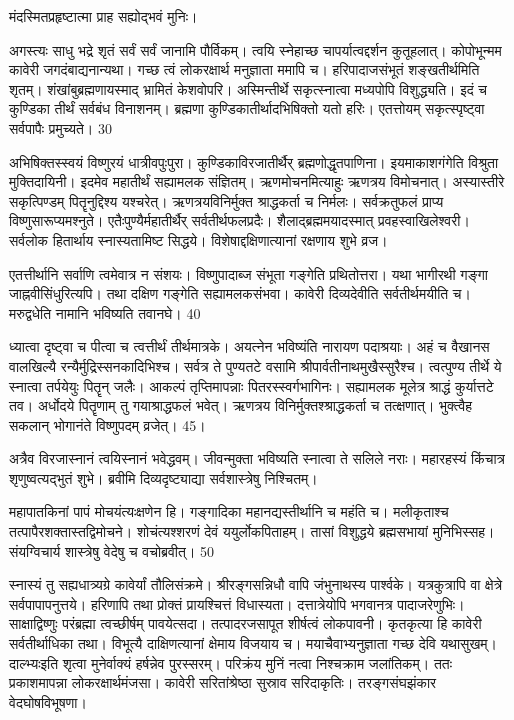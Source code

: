  मंदस्मितप्रहृष्टात्मा प्राह सह्योद्भवं मुनिः।
 
अगस्त्यः
साधु भद्रे शृतं सर्वं सर्वं जानामि पौर्विकम्।
 त्वयि स्नेहाच्छ चापर्यात्वद्दर्शन कुतूहलात्।
 कोपोभून्मम कावेरी जगदंबाद्यनान्यथा।
 गच्छ त्वं लोकरक्षार्थ मनुज्ञाता ममापि च।
 हरिपादाजसंभूतं शङ्खतीर्थमिति शृतम्।
 शंखांबुब्रह्मणायस्माद् भ्रामितं केशवोपरि।
 अस्मिन्तीर्थे सकृत्स्नात्वा मध्यपोपि विशुद्ध्यति।
 इदं च कुण्डिका तीर्थं सर्वबंध विनाशनम्।
 ब्रह्मणा कुण्डिकातीर्थादभिषिक्तो यतो हरिः।
 एतत्तोयम् सकृत्स्पृष्ट्वा सर्वपापैः प्रमुच्यते।
 30

  अभिषिक्तस्स्वयं विष्णुरयं धात्रीवपुःपुरा।
 कुण्डिकाविरजातीर्थैर् ब्रह्मणोद्धृतपाणिना।
 इयमाकाशगंगेति विश्रुता मुक्तिदायिनी।
 इदमेव महातीर्थं सह्यामलक संज्ञितम्।
 ऋणमोचनमित्याहुः ऋणत्रय विमोचनात्।
 अस्यास्तीरे सकृत्पिण्डम् पितॄनुद्दिश्य यश्चरेत्।
 ऋणत्रयविनिर्मुक्त श्राद्धकर्ता च निर्मलः।
 सर्वक्रतुफलं प्राप्य विष्णुसारूप्यमश्नुते।
 एतैःपुण्यैर्महातीर्थैर् सर्वतीर्थफलप्रदैः।
 शैलाद्ब्रह्ममयादस्मात् प्रवहस्वाखिलेश्वरी।
 सर्वलोक हितार्थाय स्नास्यतामिष्ट सिद्धये।
 विशेषाद्दक्षिणात्यानां रक्षणाय शुभे व्रज।
 
एतत्तीर्थानि सर्वाणि त्वमेवात्र न संशयः।
 विष्णुपादाब्ज संभूता गङ्गेति प्रथितोत्तरा।
 यथा भागीरथी गङ्गा जाह्नवीसिंधुरित्यपि।
 तथा दक्षिण गङ्गेति सह्यामलकसंभवा।
 कावेरी दिव्यदेवीति सर्वतीर्थमयीति च।
 मरुद्वधेति नामानि भविष्यति तवानघे।
 40

  ध्यात्वा दृष्ट्वा च पीत्वा च त्वत्तीर्थं तीर्थमात्रके।
 अयत्नेन भविष्यंति नारायण पदाश्रयाः।
 अहं च वैखानस वालखिल्यै
रन्यैर्मुद्रिस्सनकादिभिश्च।
 सर्वत्र ते पुण्यतटे वसामि
श्रीपार्वतीनाथमुखैस्सुरैश्च।
 त्वत्पुण्य तीर्थे ये स्नात्वा तर्पयेयुः पितॄन् जलैः।
 आकल्पं तृप्तिमापन्नाः पितरस्स्वर्गभागिनः।
 सह्यामलक मूलेत्र श्राद्धं कुर्यात्तटे तव।
 अर्धोदये पितॄणाम् तु गयाश्राद्धफलं भवेत्।
 ऋणत्रय विनिर्मुक्तश्श्राद्धकर्ता च तत्क्षणात्।
 भुक्त्वैह सकलान् भोगानंते विष्णुपदम् व्रजेत्।
 45।

 
 अत्रैव विरजास्नानं त्वयिस्नानं भवेद्धवम्।
 जीवन्मुक्ता भविष्यति स्नात्वा ते सलिले नराः।
 महारहस्यं किंचात्र शृणुष्वत्यद्भुतं शुभे।
 ब्रवीमि दिव्यदृष्ट्याद्या सर्वशास्त्रेषु निश्चितम्।
 
महापातकिनां पापं मोचयंत्यःक्षणेन हि।
 गङ्गादिका महानद्यस्तीर्थानि च महंति च।
 मलीकृताश्च तत्पापैरशक्तास्तद्विमोचने।
 शोचंत्यश्शरणं देवं ययुर्लोकपिताहम्।
 तासां विशुद्धये ब्रह्मसभायां मुनिभिस्सह।
 संयग्विचार्य शास्त्रेषु वेदेषु च वचोब्रवीत्।
 50

  स्नास्यं तु सह्यधात्र्यग्रे कावेर्यां तौलिसंक्रमे।
 श्रीरङ्गसन्निधौ वापि जंभुनाथस्य पार्श्वके।
 यत्रकुत्रापि वा क्षेत्रे सर्वपापापनुत्तये।
 हरिणापि तथा प्रोक्तं प्रायश्चित्तं विधास्यता।
 दत्तात्रेयोपि भगवानत्र पादाजरेणुभिः।
 साक्षाद्विष्णुः परंब्रह्मा त्वच्छीर्षम् पावयेत्सदा।
 तत्पादरजसापूत शीर्षत्वं लोकपावनी।
 कृतकृत्या हि कावेरी सर्वतीर्थाधिका तथा।
 विभूत्यै दाक्षिणत्यानां क्षेमाय विजयाय च।
 मयाचैवाभ्यनुज्ञाता गच्छ देवि यथासुखम्।
 दाल्भ्यःइति शृत्वा मुनेर्वाक्यं हर्षन्नेव पुरस्सरम्।
 परिक्रंय मुनिं नत्वा निश्चक्राम जलांतिकम्।
 ततः प्रकाशमापन्ना लोकरक्षार्थमंजसा।
 कावेरी सरितांश्रेष्ठा सुस्राव सरिदाकृतिः।
 तरङ्गसंघझंकार वेदघोषविभूषणा।
 
